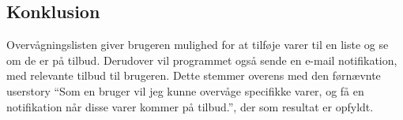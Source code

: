 \subsection{Konklusion}
Overvågningslisten giver brugeren mulighed for at tilføje varer til en liste og se om de er på tilbud. 
Derudover vil programmet også sende en e-mail notifikation, med relevante tilbud til brugeren. 
Dette stemmer overens med den førnævnte userstory ``Som en bruger vil jeg kunne overvåge specifikke varer, og få en notifikation når disse varer kommer på tilbud.'', der som resultat er opfyldt.
